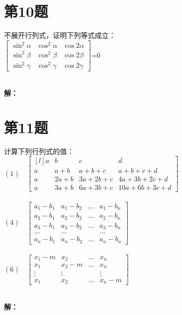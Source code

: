 \documentclass[a4paper, 12pt]{ctexart}
\begin{document}
\section{第10题}
\begin{exercise}
不展开行列式，证明下列等式成立：\\

$\begin{bmatrix}
 \sin^{2}\alpha& \cos^{2}\alpha  &\cos2\alpha  \\
 \sin^{2}\beta & \cos^{2}\beta   &\cos2\beta  \\
 \sin^{2}\gamma& \cos^{2}\gamma  &\cos2\gamma 
\end{bmatrix}$=0
\end{exercise}~\\

\noindent\textbf{解：}


\section{第11题}
\begin{exercise}
计算下列行列式的值：\\

$(1) \quad \begin{bmatrix*}[l]
  a &  b    &  c & d \\
  a &  a+b  &  a+b+c & a+b+c+d \\
  a &  2a+b &  3a+2b+c & 4a+3b+2c+d \\
  a &  3a+b &  6a+3b+c & 10a+6b+3c+d
\end{bmatrix*}$\\~\\

$(4) \quad \begin{bmatrix}
  a_{1}-b_{1} & a_{1}-b_{2}& ...   & a_{1}-b_{n}\\
  a_{2}-b_{1}& a_{2}-b_{2} & ...&a_{2}-b_{n} \\
  a_{3}-b_{1}& a_{3}-b_{2} & ... & a_{3}-b_{n}\\
  ...& ... &  & ...\\
  a_{n}-b_{1}& a_{n}-b_{2} & ... &a_{n}-b_{n}
\end{bmatrix}$\\~\\

$(6) \quad \begin{bmatrix}
  x_{1}-m & x_{2} & ... & x_{n} \\
 x_{1} &  x_{2}-m&  ...& x_{n}  \\
  \vdots & \vdots  &  & \vdots  \\
 x_{1} &  x_{2}&  ...&x_{n}-m
\end{bmatrix}$
\end{exercise}~\\
\noindent\textbf{解：}
\end{document}
